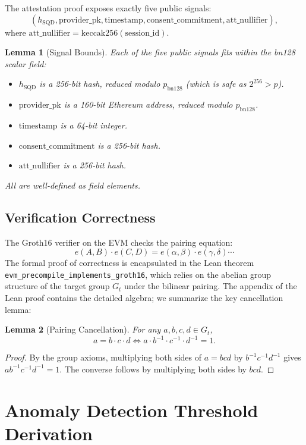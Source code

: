\documentclass[11pt,a4paper]{article}
\newtheorem{lemma}{Lemma}
\theoremstyle{plain}
\begin{document}
The attestation proof exposes exactly five public signals:
\[
(h_{\mathrm{SQD}}, \text{provider\_pk}, \text{timestamp}, \text{consent\_commitment}, \text{att\_nullifier}),
\]
where $\text{att\_nullifier} = \text{keccak256}(\text{session\_id})$.

\begin{lemma}[Signal Bounds]
Each of the five public signals fits within the bn128 scalar field:
\begin{itemize}
    \item $h_{\mathrm{SQD}}$ is a 256-bit hash, reduced modulo $p_{\mathrm{bn128}}$ (which is safe as $2^{256} > p$).
    \item $\text{provider\_pk}$ is a 160-bit Ethereum address, reduced modulo $p_{\mathrm{bn128}}$.
    \item $\text{timestamp}$ is a 64-bit integer.
    \item $\text{consent\_commitment}$ is a 256-bit hash.
    \item $\text{att\_nullifier}$ is a 256-bit hash.
\end{itemize}
All are well-defined as field elements.
\end{lemma}

\subsection{Verification Correctness}

The Groth16 verifier on the EVM checks the pairing equation:
\[
e(A, B) \cdot e(C, D) = e(\alpha, \beta) \cdot e(\gamma, \delta) \cdots
\]
The formal proof of correctness is encapsulated in the Lean theorem \texttt{evm\_precompile\_implements\_groth16}, which relies on the abelian group structure of the target group $G_t$ under the bilinear pairing. The appendix of the Lean proof contains the detailed algebra; we summarize the key cancellation lemma:

\begin{lemma}[Pairing Cancellation]
For any $a,b,c,d \in G_t$,
\[
a = b \cdot c \cdot d \iff a \cdot b^{-1} \cdot c^{-1} \cdot d^{-1} = 1.
\]
\end{lemma}

\begin{proof}
By the group axioms, multiplying both sides of $a = b c d$ by $b^{-1} c^{-1} d^{-1}$ gives $a b^{-1} c^{-1} d^{-1} = 1$. The converse follows by multiplying both sides by $b c d$.
\end{proof}

\section{Anomaly Detection Threshold Derivation}
\end{document}
